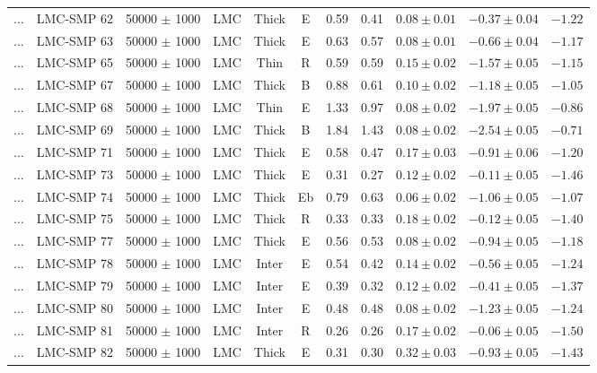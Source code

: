 \documentclass[useAMS]{mn2e}
\begin{document}
\begin{center}
{\begin{longtable}{llccccccccc}
$\ldots$	&	LMC-SMP 62	&	50000 $\pm$ 1000	&	LMC	&	Thick	&	E	&	0.59	&	0.41	&	$0.08 \pm  0.01$	&	$-0.37 \pm 0.04$	&	$-1.22$	\\
$\ldots$	&	LMC-SMP 63	&	50000 $\pm$ 1000	&	LMC	&	Thick	&	E	&	0.63	&	0.57	&	$0.08 \pm  0.01$	&	$-0.66 \pm 0.04$	&	$-1.17$	\\
$\ldots$	&	LMC-SMP 65	&	50000 $\pm$ 1000	&	LMC	&	Thin	&	R	&	0.59	&	0.59	&	$0.15 \pm  0.02$	&	$-1.57 \pm 0.05$	&	$-1.15$	\\
$\ldots$	&	LMC-SMP 67	&	50000 $\pm$ 1000	&	LMC	&	Thick	&	B	&	0.88	&	0.61	&	$0.10 \pm  0.02$	&	$-1.18 \pm 0.05$	&	$-1.05$	\\
$\ldots$	&	LMC-SMP 68	&	50000 $\pm$ 1000	&	LMC	&	Thin	&	E	&	1.33	&	0.97	&	$0.08 \pm  0.02$	&	$-1.97 \pm 0.05$	&	$-0.86$	\\
$\ldots$	&	LMC-SMP 69	&	50000 $\pm$ 1000	&	LMC	&	Thick	&	B	&	1.84	&	1.43	&	$0.08 \pm  0.02$	&	$-2.54 \pm 0.05$	&	$-0.71$	\\
$\ldots$	&	LMC-SMP 71	&	50000 $\pm$ 1000	&	LMC	&	Thick	&	E	&	0.58	&	0.47	&	$0.17 \pm  0.03$	&	$-0.91 \pm 0.06$	&	$-1.20$	\\
$\ldots$	&	LMC-SMP 73	&	50000 $\pm$ 1000	&	LMC	&	Thick	&	E	&	0.31	&	0.27	&	$0.12 \pm  0.02$	&	$-0.11 \pm 0.05$	&	$-1.46$	\\
$\ldots$	&	LMC-SMP 74	&	50000 $\pm$ 1000	&	LMC	&	Thick	&	Eb	&	0.79	&	0.63	&	$0.06 \pm  0.02$	&	$-1.06 \pm 0.05$	&	$-1.07$	\\
$\ldots$	&	LMC-SMP 75	&	50000 $\pm$ 1000	&	LMC	&	Thick	&	R	&	0.33	&	0.33	&	$0.18 \pm  0.02$	&	$-0.12 \pm 0.05$	&	$-1.40$	\\
$\ldots$	&	LMC-SMP 77	&	50000 $\pm$ 1000	&	LMC	&	Thick	&	E	&	0.56	&	0.53	&	$0.08 \pm  0.02$	&	$-0.94 \pm 0.05$	&	$-1.18$	\\
$\ldots$	&	LMC-SMP 78	&	50000 $\pm$ 1000	&	LMC	&	Inter	&	E	&	0.54	&	0.42	&	$0.14 \pm  0.02$	&	$-0.56 \pm 0.05$	&	$-1.24$	\\
$\ldots$	&	LMC-SMP 79	&	50000 $\pm$ 1000	&	LMC	&	Inter	&	E	&	0.39	&	0.32	&	$0.12 \pm  0.02$	&	$-0.41 \pm 0.05$	&	$-1.37$	\\
$\ldots$	&	LMC-SMP 80	&	50000 $\pm$ 1000	&	LMC	&	Inter	&	E	&	0.48	&	0.48	&	$0.08 \pm  0.02$	&	$-1.23 \pm 0.05$	&	$-1.24$	\\
$\ldots$	&	LMC-SMP 81	&	50000 $\pm$ 1000	&	LMC	&	Inter	&	R	&	0.26	&	0.26	&	$0.17 \pm  0.02$	&	$-0.06 \pm 0.05$	&	$-1.50$	\\
$\ldots$	&	LMC-SMP 82	&	50000 $\pm$ 1000	&	LMC	&	Thick	&	E	&	0.31	&	0.30	&	$0.32 \pm  0.03$	&	$-0.93 \pm 0.05$	&	$-1.43$	\\

\end{longtable}}
\end{center}
\end{document}
